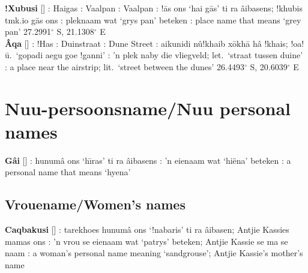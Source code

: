 \newpage

\textbf{!Xubusi} [] :
\textvertline{}Hai\textdoublebarpipe{}gas : Vaalpan
: Vaalpan : !\={a}s \textvertline{}ons
`\textvertline{}hai \textdoublebarpipe{}g\={a}s' ti ra
\textdoublebarpipe{}\^{a}ibasens; !khubis tmk.io
\textdoublebarpipe{}g\={a}s \textvertline{}ons :
pleknaam wat `grys pan' beteken : place name that means
`grey pan' 27.2991$^{\circ}$ S, 21.1308$^{\circ}$ E \\

\textbf{\textdoublebarpipe{}\^{A}qa}
[] : !Has
: Duinstraat : Dune Street
: aikunidi \textdoublebarpipe{}n\^{u}!khaib
x\={o}\textvertline{}kh\={a} h\^{a} !khais; !oa!\={u}.\
`\textvertline{}gopadi \textdoublevertline{}aegu
\textdoublevertline{}goe !ganni' : 'n plek naby die
vliegveld; let.\ `straat tussen duine' \underbar{Eng}: a place near
the airstrip; lit.\ `street between the dunes' 26.4493$^{\circ}$ S,
20.6039$^{\circ}$ E


\markboth{}{}
\section{N\textipa{\textvertline}uu-persoonsname/N\textvertline{}uu
personal names}
\markboth{}{}

\textbf{G\textdoublevertline{}\^{a}i}
[] :
\textdoublebarpipe{}hunum\^{a} \textvertline{}ons
`\textdoublebarpipe{}h\={\i}ras' ti ra
\textdoublebarpipe{}\^{a}ibasens : 'n eienaam wat
`hi\"{e}na' beteken : a personal name that means `hyena'



\markboth{}{}
\subsection*{Vrouename/Women's names}
\markboth{}{}

\textbf{Caqbakusi} [] :
tarekhoes \textdoublebarpipe{}hunum\^{a} \textvertline{}ons `!nabaris'
ti ra \textdoublebarpipe{}\^{a}ibasen; Antjie Kassies mamas
\textvertline{}ons : 'n vrou se eienaam wat `patrys'
beteken; Antjie Kassie se ma se naam \underbar{Eng}: a woman's
personal name meaning `sandgrouse'; Antjie Kassie's mother's name \\

